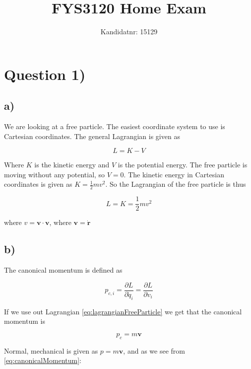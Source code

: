 \documentclass[a4paper,norsk, 10pt]{article}
\title{FYS3120 Home Exam}
\author{Kandidatnr: 15129}
\begin{document}
\maketitle

\section*{Question 1)}

\subsection*{a)}
We are looking at a free particle. The easiest coordinate system to use is Cartesian coordinates. The general Lagrangian is given as 

\begin{equation}
L = K - V
\label{eq:lagrangian}
\end{equation}

Where $K$ is the kinetic energy and $V$ is the potential energy. The free particle is moving without any potential, so $V = 0$. The kinetic energy in Cartesian coordinates is given as $K = \frac{1}{2}mv^2$. So the Lagrangian of the free particle is thus

\begin{equation}
L = K = \frac{1}{2}mv^2
\label{eq:lagrangianFreeParticle}
\end{equation}

where $v = \mathbf{v}\cdot \mathbf{v}$, where $\mathbf{v} = \dot{\mathbf{r}}$

\subsection*{b)}

The canonical momentum is defined as

\begin{equation}
p_{c,i} = \frac{\partial L}{\partial \dot{q}_i} =\frac{\partial L}{\partial v_i} 
\end{equation}

If we use out Lagrangian \eqref{eq:lagrangianFreeParticle} we get that the canonical momentum is 

\begin{equation}
p_c = m\mathbf{v}
\label{eq:canonicalMomentum}
\end{equation}

Normal, mechanical is given as $p = m\mathbf{v}$, and as we see from \eqref{eq:canonicalMomentum}:
\end{document}
